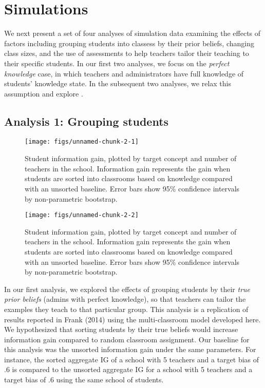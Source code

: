 \documentclass[man]{apa6}
\newenvironment{CodeChunk}{}{}
\begin{document}
\section{Simulations}\label{simulations}

We next present a set of four analyses of simulation data examining the
effects of factors including grouping students into classess by their
prior beliefs, changing class sizes, and the use of assessments to help
teachers tailor their teaching to their specific students. In our first
two analyses, we focus on the \emph{perfect knowledge} case, in which
teachers and administrators have full knowledge of students' knowledge
state. In the subsequent two analyses, we relax this assumption and
explore .

\subsection{Analysis 1: Grouping
students}\label{analysis-1-grouping-students}

\begin{CodeChunk}
\begin{figure}[t]
\texttt{[image: figs/unnamed-chunk-2-1]} \caption[Student information gain, plotted by target concept and number of teachers in the school]{Student information gain, plotted by target concept and number of teachers in the school. Information gain represents the gain when students are sorted into classrooms based on knowledge compared with an unsorted baseline. Error bars show 95\% confidence intervals by non-parametric bootstrap.}\label{fig:unnamed-chunk-21}
\end{figure}
\begin{figure}[t]
\texttt{[image: figs/unnamed-chunk-2-2]} \caption[Student information gain, plotted by target concept and number of teachers in the school]{Student information gain, plotted by target concept and number of teachers in the school. Information gain represents the gain when students are sorted into classrooms based on knowledge compared with an unsorted baseline. Error bars show 95\% confidence intervals by non-parametric bootstrap.}\label{fig:unnamed-chunk-22}
\end{figure}
\end{CodeChunk}

In our first analysis, we explored the effects of grouping students by
their \emph{true prior beliefs} (admins with perfect knowledge), so that
teachers can tailor the examples they teach to that particular group.
This analysis is a replication of results reported in Frank (2014) using
the multi-classroom model developed here. We hypothesized that sorting
students by their true beliefs would increase information gain compared
to random classroom assignment. Our baseline for this analysis was the
unsorted information gain under the same parameters. For instance, the
sorted aggregate IG of a school with 5 teachers and a target bias of .6
is compared to the unsorted aggregate IG for a school with 5 teachers
and a target bias of .6 using the same school of students.
\end{document}
